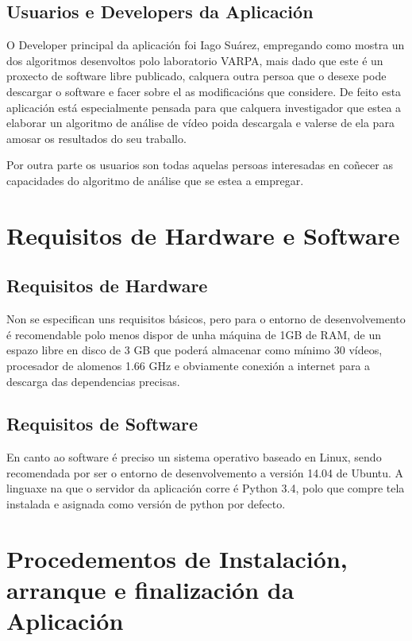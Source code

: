 \documentclass[11pt, a4paper, twoside, titlepage]{book}
\begin{document}
    \section{Usuarios e Developers da Aplicación}
        O Developer principal da aplicación foi Iago Suárez, empregando como mostra un dos algoritmos
        desenvoltos polo laboratorio VARPA, mais dado que este é un proxecto de software libre 
        publicado, calquera outra persoa que o desexe pode descargar o software e facer sobre el as
        modificacións que considere. De feito esta aplicación está especialmente pensada para que 
        calquera investigador que estea a elaborar un algoritmo de análise de vídeo poida descargala
        e valerse de ela para amosar os resultados do seu traballo.
        
        Por outra parte os usuarios son todas aquelas persoas interesadas en coñecer as capacidades
        do algoritmo de análise que se estea a empregar.
        
\chapter{Requisitos de Hardware e Software}

    \section{Requisitos de Hardware}
        Non se especifican uns requisitos básicos, pero para o entorno de desenvolvemento é 
        recomendable polo menos dispor de unha máquina de 1GB de RAM, de un espazo libre en disco de 
        3 GB que poderá almacenar como mínimo 30 vídeos, procesador de alomenos 1.66 GHz e 
        obviamente conexión a internet para a descarga das dependencias precisas.

    \section{Requisitos de Software}
        En canto ao software é preciso un sistema operativo baseado en Linux, sendo recomendada por ser
        o entorno de desenvolvemento a versión 14.04 de Ubuntu. A linguaxe na que o servidor da 
        aplicación corre é Python 3.4, polo que compre tela instalada e asignada como versión de
        python por defecto.
        
\chapter{Procedementos de Instalación, arranque e finalización da Aplicación}
\end{document}
